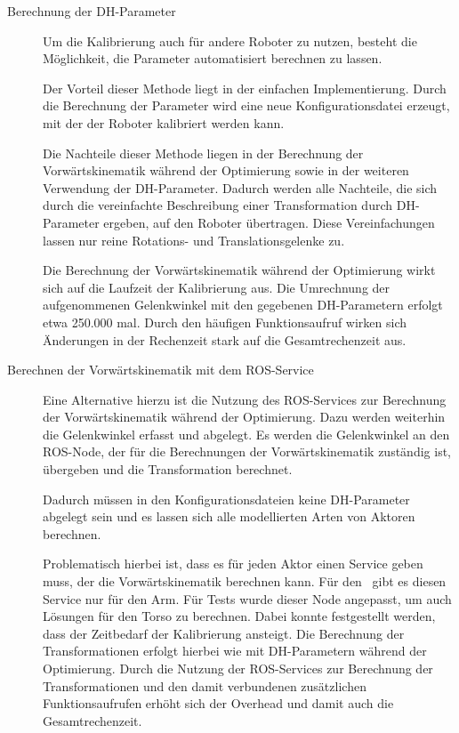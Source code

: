 \begin{description}
  \item[Berechnung der \ac{DH-Parameter}] %

    \label{ssub:Berechnung der dh-par}

    Um die Kalibrierung auch für andere Roboter zu nutzen,
    besteht die Möglichkeit, die Parameter automatisiert berechnen zu lassen.
    
    Der Vorteil
    dieser Methode liegt in der einfachen Implementierung. Durch die Berechnung der Parameter 
    wird eine neue Konfigurationsdatei erzeugt, mit der der Roboter kalibriert werden kann.

    Die Nachteile dieser Methode liegen in der Berechnung der Vorwärtskinematik während der
    Optimierung sowie in der weiteren Verwendung der \ac{DH-Parameter}. Dadurch 
    werden alle Nachteile, die sich durch die vereinfachte Beschreibung einer 
    Transformation durch \ac{DH-Parameter} ergeben, auf den Roboter übertragen.
    Diese Vereinfachungen lassen nur reine Rotations- und Translationsgelenke zu.

    Die Berechnung der Vorwärtskinematik während der Optimierung wirkt sich auf die 
    Laufzeit der Kalibrierung aus. Die Umrechnung der aufgenommenen Gelenkwinkel mit 
    den gegebenen \ac{DH-Parameter}n erfolgt etwa 250.000 mal. Durch den häufigen 
    Funktionsaufruf wirken sich Änderungen in der Rechenzeit stark auf die 
    Gesamtrechenzeit aus.
  \item[Berechnen der Vorwärtskinematik mit dem ROS-Service] %

    \label{ssub:Berechnen der Vorwärtskinematik mit dem ROS-Service}

    Eine Alternative hierzu ist die Nutzung des ROS-Services zur Berechnung der
    Vorwärtskinematik während der Optimierung.
    Dazu werden weiterhin die Gelenkwinkel erfasst und abgelegt. Es werden
    die Gelenkwinkel an den ROS-Node, der für die Berechnungen der
    Vorwärtskinematik zuständig ist, 
    übergeben und die Transformation berechnet.
    
    Dadurch müssen in den
    Konfigurationsdateien keine
    \ac{DH-Parameter} abgelegt sein und es lassen sich alle modellierten Arten
    von Aktoren berechnen.

    Problematisch hierbei ist, dass es für jeden Aktor einen Service geben
    muss, der die Vorwärtskinematik berechnen kann. Für den \cob\ gibt es diesen Service nur für den Arm.
    Für Tests wurde dieser Node angepasst, um auch Lösungen für den Torso zu berechnen.
    Dabei konnte festgestellt werden, dass der Zeitbedarf der Kalibrierung ansteigt.
    Die Berechnung der Transformationen erfolgt hierbei wie mit \ac{DH-Parameter}n
    während der Optimierung.
    Durch die Nutzung der \ac{ROS}-Services zur Berechnung 
    der Transformationen und den damit verbundenen zusätzlichen Funktionsaufrufen 
    erhöht sich der Overhead und damit auch die Gesamtrechenzeit. 



\end{description}
